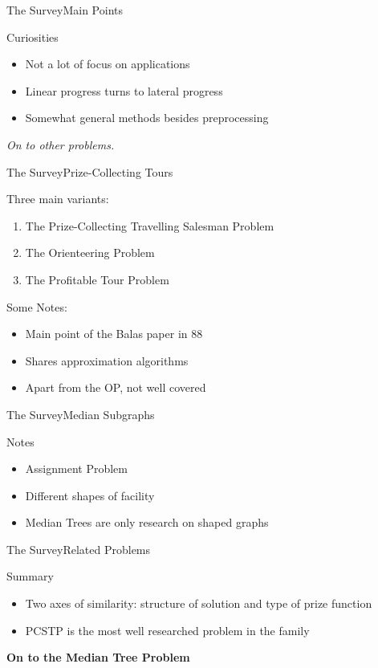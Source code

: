 \documentclass[rgb,dvipsnames]{beamer}
\begin{document}
\begin{frame}{The Survey}{Main Points}
  \begin{block}{Curiosities} \pause
  \begin{itemize}
  \item Not a lot of focus on applications
  \item Linear progress turns to lateral progress
  \item Somewhat general methods besides preprocessing
  \end{itemize}
\end{block}
\textit{On to other problems.}
\end{frame}

\begin{frame}{The Survey}{Prize-Collecting Tours}
  \begin{block}{Three main variants:}
    \begin{enumerate}
    \item The Prize-Collecting Travelling Salesman Problem
    \item The Orienteering Problem
    \item The Profitable Tour Problem
    \end{enumerate}
  \end{block}
  \pause
  \begin{block}{Some Notes:}
  \begin{itemize}
  \item Main point of the Balas paper in 88
  \item Shares approximation algorithms
  \item Apart from the OP, not well covered
  \end{itemize}
\end{block}

\end{frame}

\begin{frame}{The Survey}{Median Subgraphs}
  \begin{block}{Notes}
    \begin{itemize}
    \item Assignment Problem
    \item Different shapes of facility
    \item Median Trees are only research on shaped graphs
  \end{itemize}
\end{block}
\end{frame}

\begin{frame}{The Survey}{Related Problems}
  \begin{block}{Summary}
  \begin{itemize}
  \item Two axes of similarity: structure of solution and type of prize function
  \item PCSTP is the most well researched problem in the family
  \end{itemize}
\end{block}\pause
  \textbf{On to the Median Tree Problem}
\end{frame}
\end{document}
